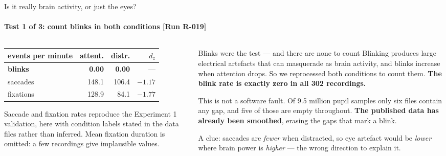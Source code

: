 \documentclass[aspectratio=169,10pt]{beamer}
\makeatletter
\newcommand{\runtag}[1]{{\scriptsize\color{mubeamer@gray7}[#1]}}
\newcommand{\sidenote}[1]{{\scriptsize\color{mubeamer@gray7}\sloppy\par#1\par}}
\makeatother
\begin{document}
\begin{frame}{Is it really brain activity, or just the eyes?}
  \framesubtitle{Test 1 of 3: count blinks in both conditions \runtag{Run R-019}}
  \begin{columns}[T]
    \begin{column}{0.50\textwidth}
      \scriptsize
      \begin{tabular}{@{}lrrr@{}}
        \toprule
        events per minute & attent. & distr. & $d_z$ \\
        \midrule
        \textbf{blinks}   & \textbf{0.00} & \textbf{0.00} & \alert{---} \\
        saccades  & 148.1 & 106.4 & $-1.17$ \\
        fixations & 128.9 &  84.1 & $-1.77$ \\
        \bottomrule
      \end{tabular}

      \vspace{0.5em}
      \sidenote{Saccade and fixation rates reproduce the Experiment 1
      validation, here with condition labels stated in the data files rather
      than inferred. Mean fixation duration is omitted: a few recordings give
      implausible values.}
    \end{column}
    \begin{column}{0.46\textwidth}
      \begin{block}{Blinks were the test --- and there are none to count}
        \small
        Blinking produces large electrical artefacts that can masquerade as
        brain activity, and blinks increase when attention drops. So we
        reprocessed both conditions to count them. \textbf{The blink rate is
        exactly zero in all 302 recordings.}

        \vspace{0.3em}
        This is not a software fault. Of 9.5 million pupil samples only six
        files contain any gap, and five of those are empty throughout.
        \textbf{The published data has already been smoothed}, erasing the
        gaps that mark a blink.
      \end{block}
      \sidenote{A clue: saccades are \emph{fewer} when distracted, so eye
      artefact would be \emph{lower} where brain power is \emph{higher} ---
      the wrong direction to explain it.}
    \end{column}
  \end{columns}
\end{frame}
\end{document}
